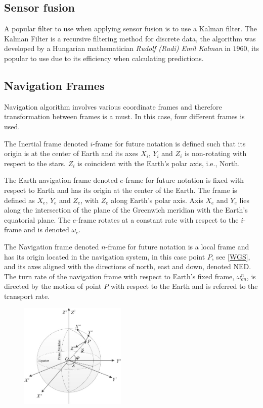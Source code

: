 \subsection{Sensor fusion}
A popular filter to use when applying sensor fusion is to use a Kalman filter. The Kalman Filter is a recursive filtering method for discrete data, the algorithm was developed by a Hungarian mathematician \emph{Rudolf (Rudi) Emil Kalman} in $1960$, its popular to use due to its efficiency when calculating predictions\cite{kf eff}.

\subsection{Navigation Frames}
Navigation algorithm involves various coordinate frames and therefore transformation between frames is a must. In this case, four different frames is used.

The Inertial frame denoted $i$-frame for future notation is defined such that its origin is at the center of Earth and its axes $X_i$, $Y_i$ and $Z_i$ is non-rotating with respect to the stars. $Z_i$ is coincident with the Earth's polar axis, i.e., North.

The Earth navigation frame denoted $e$-frame for future notation is fixed with respect to Earth and has its origin at the center of the Earth. The frame is defined as $X_e$, $Y_e$ and $Z_e$, with $Z_e$ along Earth's polar axis. Axis $X_e$ and $Y_e$ lies along the intersection of the plane of the Greenwich meridian with the Earth's equatorial plane. The $e$-frame rotates at a constant rate with respect to the $i$-frame and is denoted $\omega_e$.

The Navigation frame denoted $n$-frame for future notation is a local frame and has its origin located in the navigation system, in this case point $P$, see \autoref{WGS}, and its axes aligned with the directions of north, east and down, denoted NED. The turn rate of the navigation frame with respect to Earth's fixed frame, $\omega_{en}^n$, is directed by the motion of point $P$ with respect to the Earth and is referred to the transport rate.   
\begin{figure}[H]
\centering
\includegraphics[width=0.45\textwidth]{Figures/WGS-coordinates.png}
\label{WGS}
\end{figure}

